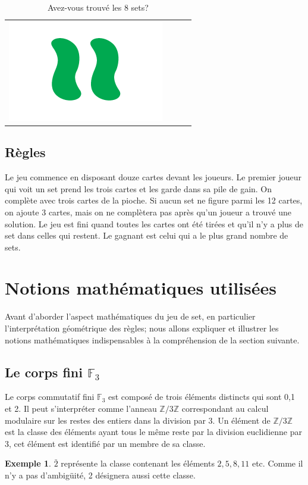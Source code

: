 \documentclass[a4paper,12pt,titlepage]{article}
\theoremstyle{plain}
\theoremstyle{definition}
\newtheorem{ex}{Exemple}
\begin{document}
\begin{table}[h]
\begin{tabular}{ c | c | c | c }
\includegraphics[scale=0.2]{Img/1011.png} \\
\end{tabular}
\caption{Avez-vous trouvé les 8 sets?}
\end{table}

\subsection{Règles}
Le jeu commence en disposant douze cartes devant les joueurs.
Le premier joueur qui voit un set prend les trois cartes et les garde dans sa pile de gain. 
On complète avec trois cartes de la pioche. Si aucun set ne figure parmi les 12 cartes, on ajoute 3 cartes, mais on ne complètera pas après qu'un joueur a trouvé une solution.
Le jeu est fini quand toutes les cartes ont été tirées et qu'il n'y a plus de set dans celles qui restent.
Le gagnant est celui qui a le plus grand nombre de sets. 

\newpage
\section{Notions mathématiques utilisées}
Avant d'aborder l'aspect mathématiques du jeu de set, en particulier l'interprétation géométrique des règles; nous allons expliquer et illustrer les notions mathématiques indispensables à la compréhension de la section suivante. 

\subsection{Le corps fini $\mathbb{F}_3$}
Le corps commutatif fini $\mathbb{F}_3$ est composé de trois éléments distincts qui sont 0,1 et 2. Il peut s'interpréter comme l'anneau $\mathbb{Z}/3\mathbb{Z}$ correspondant au calcul modulaire sur les restes des entiers dans la division par 3. Un élément de $\mathbb{Z}/3\mathbb{Z}$ est la classe des éléments ayant tous le même reste par la division euclidienne par 3, cet élément est identifié par un membre de sa classe.
\begin{ex}
$\bar{2}$ représente la classe contenant les éléments $2,5,8,11$ etc. Comme il n'y a pas d'ambigüité, 2 désignera aussi cette classe.
\end{ex}
\end{document}
